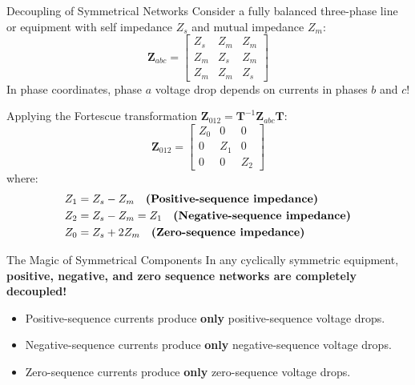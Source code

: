 \begin{frame}[allowframebreaks]{Decoupling of Symmetrical Networks}
    Consider a fully balanced three-phase line or equipment with self impedance $Z_s$ and mutual impedance $Z_m$:
    \begin{equation}
        \mathbf{Z}_{abc} = \begin{bmatrix}
            Z_s & Z_m & Z_m \\
            Z_m & Z_s & Z_m \\
            Z_m & Z_m & Z_s
        \end{bmatrix}
    \end{equation}
    In phase coordinates, phase $a$ voltage drop depends on currents in phases $b$ and $c$!

    Applying the Fortescue transformation $\mathbf{Z}_{012} = \mathbf{T}^{-1} \mathbf{Z}_{abc} \mathbf{T}$:
    \begin{equation}
        \mathbf{Z}_{012} = \begin{bmatrix}
            Z_0 & 0 & 0 \\
            0 & Z_1 & 0 \\
            0 & 0 & Z_2
        \end{bmatrix}
    \end{equation}
    where:
    \begin{align}
        Z_1 &= Z_s - Z_m \quad \text{\bf (Positive-sequence impedance)} \\
        Z_2 &= Z_s - Z_m = Z_1 \quad \text{\bf (Negative-sequence impedance)} \\
        Z_0 &= Z_s + 2 Z_m \quad \text{\bf (Zero-sequence impedance)}
    \end{align}

    \begin{alertblock}{The Magic of Symmetrical Components}
        In any cyclically symmetric equipment, \textbf{positive, negative, and zero sequence networks are completely decoupled!}
        \begin{itemize}
            \item Positive-sequence currents produce \textbf{only} positive-sequence voltage drops.
            \item Negative-sequence currents produce \textbf{only} negative-sequence voltage drops.
            \item Zero-sequence currents produce \textbf{only} zero-sequence voltage drops.
        \end{itemize}
    \end{alertblock}
\end{frame}

